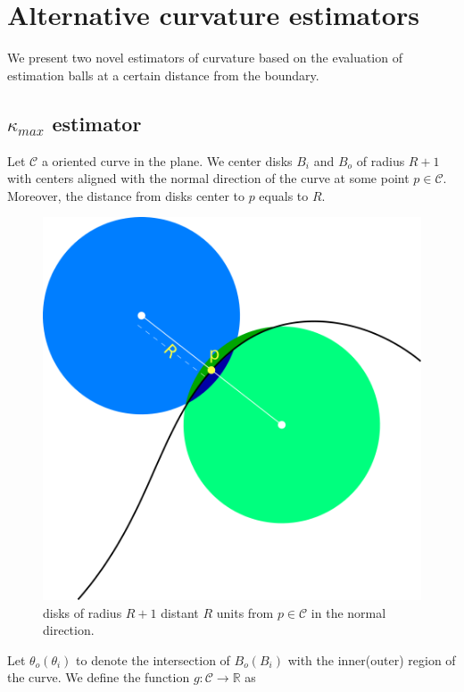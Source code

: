 \chapter{Alternative curvature estimators}\label{chapter:alternative-curvature-estimators}

We present two novel estimators of curvature based on the evaluation of estimation balls at a certain distance from the boundary. 

\section{$\kappa_{max}$ estimator}

Let $\mathcal{C}$ a oriented curve in the plane. We center disks $B_i$ and $B_o$ of radius $R+1$ with centers aligned with the normal direction of the curve at some point $p \in \mathcal{C}$. Moreover, the distance from disks center to $p$ equals to $R$.

\begin{figure}[h!]\label{fig:r-separated-disks}
\center
\includegraphics[scale=0.35]{figures/chapter5/max-energy/r-separated-disks.png}
\caption{disks of radius $R+1$ distant $R$ units from $p\in \mathcal{C}$ in the normal direction.}
\end{figure}

Let $\theta_o (\theta_i)$ to denote the intersection of $B_o(B_i)$ with the inner(outer) region of the curve. We define the function $g:\mathcal{C}\rightarrow \mathbb{R}$ as


